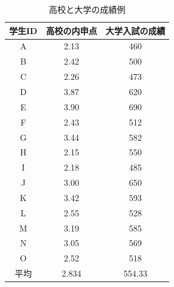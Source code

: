 \begin{table}[ht]
	\caption{高校と大学の成績例}
	\centering
	\begin{tabular}[t]{ccc}
		\hline
		学生ID & 高校の内申点 & 大学入試の成績 \\\hline
		A    & 2.13   & 460     \\
		B    & 2.42   & 500     \\
		C    & 2.26   & 473     \\
		D    & 3.87   & 620     \\
		E    & 3.90   & 690     \\
		F    & 2.43   & 512     \\
		G    & 3.44   & 582     \\
		H    & 2.15   & 550     \\
		I    & 2.18   & 485     \\
		J    & 3.00   & 650     \\
		K    & 3.42   & 593     \\
		L    & 2.55   & 528     \\
		M    & 3.19   & 585     \\
		N    & 3.05   & 569     \\
		O    & 2.52   & 518     \\\hline
		平均   & 2.834  & 554.33  \\
	\end{tabular}
	\label{tbl09_01}
\end{table}
